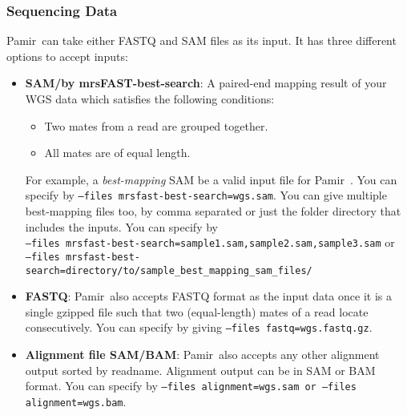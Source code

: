 \documentclass{article}
\newcommand{\toolName}{Pamir~}
\begin{document}
\subsubsection{Sequencing Data}
\toolName can take either FASTQ and SAM files as its input. It has three different options to accept inputs:
\begin{itemize}
\item \textbf{SAM/by mrsFAST-best-search}: A paired-end mapping result of your WGS data which satisfies the following conditions: 
    \begin{itemize}
    \item Two mates from a read are grouped together.
    \item All mates are of equal length.
    \end{itemize}
For example, a \textit{best-mapping} SAM be a valid input file for \toolName. 
You can specify by \texttt{--files mrsfast-best-search=wgs.sam}.
You can give multiple best-mapping files too, by comma separated or just the folder directory that includes the inputs. You can specify by\\
\texttt{--files mrsfast-best-search=sample1.sam,sample2.sam,sample3.sam} or \\
\texttt{--files mrsfast-best-search=directory/to/sample\_best\_mapping\_sam\_files/} 

\item \textbf{FASTQ}: \toolName also accepts FASTQ format as the input data once it is a single gzipped file such that two (equal-length) mates of a read locate consecutively. You can specify by giving \texttt{--files fastq=wgs.fastq.gz}.

\item \textbf{Alignment file SAM/BAM}: \toolName also accepts any other alignment output sorted by readname. Alignment output can be in SAM or BAM format. You can specify by \texttt{--files alignment=wgs.sam or --files alignment=wgs.bam}.
\end{itemize}
\end{document}
